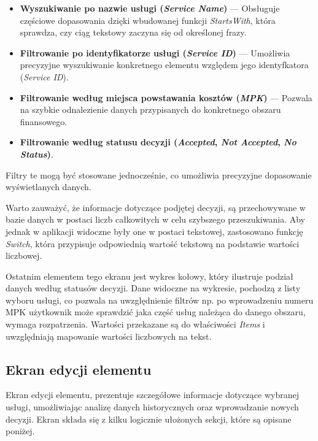 \begin{itemize}
\item \textbf{Wyszukiwanie po nazwie usługi (\emph{Service Name})} — Obsługuje częściowe dopasowania dzięki wbudowanej funkcji \emph{StartsWith}, która sprawdza, czy ciąg tekstowy zaczyna się od określonej frazy.
\item \textbf{Filtrowanie po identyfikatorze usługi (\emph{Service ID})} — Umożliwia precyzyjne wyszukiwanie konkretnego elementu względem jego identyfkatora (\emph{Service ID}).
\item \textbf{Filtrowanie według miejsca powstawania kosztów (\emph{MPK})} — Pozwala na szybkie odnalezienie danych przypisanych do konkretnego obszaru finansowego.
\item \textbf{Filtrowanie według statusu decyzji (\emph{Accepted}, \emph{Not Accepted}, \emph{No Status})}.
\end{itemize}

Filtry te mogą być stosowane jednocześnie, co umożliwia precyzyjne dopasowanie wyświetlanych danych.

Warto zauważyć, że informacje dotyczące podjętej decyzji, są przechowywane w bazie danych w postaci liczb całkowitych w celu szybszego przeszukiwania. Aby jednak w aplikacji widoczne były one w postaci tekstowej, zastosowano funkcję \emph{Switch}, która przypisuje odpowiednią wartość tekstową na podstawie wartości liczbowej. 
\\
\par
Ostatnim elementem tego ekranu jest wykres kołowy, który ilustruje podział danych według statusów decyzji.
Dane widoczne na wykresie, pochodzą z listy wyboru usługi, co pozwala na uwzględnienie filtrów np. po wprowadzeniu numeru MPK użytkownik może sprawdzić jaka część usług należąca do danego obszaru, wymaga rozpatrzenia. Wartości przekazane są do właściwości \emph{Items} i uwzględniają mapowanie wartości liczbowych na tekst. 



\subsection{Ekran edycji elementu}

Ekran edycji elementu, prezentuje szczegółowe informacje dotyczące wybranej usługi, umożliwiając analizę danych historycznych oraz wprowadzanie nowych decyzji. Ekran składa się z kilku logicznie ułożonych sekcji, które są opisane poniżej.


